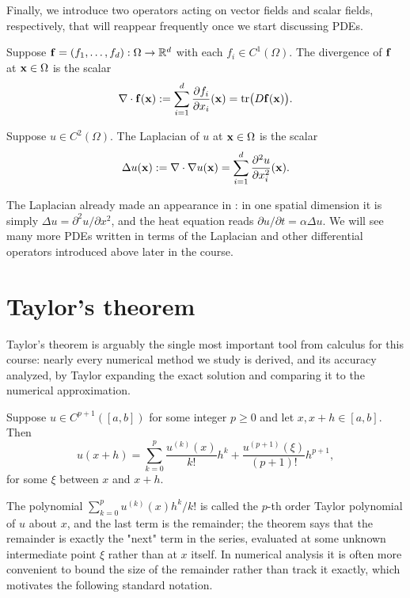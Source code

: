 Finally, we introduce two operators acting on vector fields and scalar
fields, respectively, that will reappear frequently once we start
discussing PDEs.

\begin{definition}[Divergence]
    Suppose $\mathbf{f} = (f_1, \ldots, f_d): \Omega \to \mathbb{R}^d$ with each $f_i
    \in C^1(\Omega)$. The divergence of $\mathbf{f}$ at $\mathbf{x} \in \Omega$ is the
    scalar
    \begin{equation*}
        \nabla \cdot \mathbf{f}(\mathbf{x}) :=
        \sum_{i=1}^d \frac{\partial f_i}{\partial x_i}(\mathbf{x}) =
        \mathrm{tr}\big(D\mathbf{f}(\mathbf{x})\big).
    \end{equation*}
\end{definition}

\begin{definition}[Laplacian]
    Suppose $u \in C^2(\Omega)$. The Laplacian of $u$ at $\mathbf{x} \in
    \Omega$ is the scalar
    \begin{equation*}
        \Delta u(\mathbf{x}) := \nabla \cdot \nabla u(\mathbf{x}) =
        \sum_{i=1}^d \frac{\partial^2 u}{\partial x_i^2}(\mathbf{x}).
    \end{equation*}
\end{definition}
The Laplacian already made an appearance in : in
one spatial dimension it is simply $\Delta u = \partial^2 u/\partial
x^2$, and the heat equation reads $\partial u/\partial t = \alpha \Delta
u$. We will see many more PDEs written in terms of the Laplacian and
other differential operators introduced above later in the course.


\section{Taylor's theorem}

Taylor's theorem is arguably the single most important tool from
calculus for this course: nearly every numerical method we study is
derived, and its accuracy analyzed, by Taylor expanding the exact
solution and comparing it to the numerical approximation.

\begin{theorem}
    \label{thm:taylor-1d}
    Suppose $u \in C^{p+1}([a,b])$ for some integer $p \ge 0$ and let
    $x, x+h \in [a,b]$. Then
    \begin{equation*}
        u(x+h) = \sum_{k=0}^p \frac{u^{(k)}(x)}{k!} h^k +
        \frac{u^{(p+1)}(\xi)}{(p+1)!} h^{p+1},
    \end{equation*}
    for some $\xi$ between $x$ and $x+h$.
\end{theorem}
The polynomial $\sum_{k=0}^p u^{(k)}(x) h^k / k!$ is called the $p$-th
order Taylor polynomial of $u$ about $x$, and the last term is the
remainder; the theorem says that the remainder is exactly the "next"
term in the series, evaluated at some unknown intermediate point $\xi$
rather than at $x$ itself. In numerical analysis it is often more
convenient to bound the size of the remainder rather than track it
exactly, which motivates the following standard notation.

